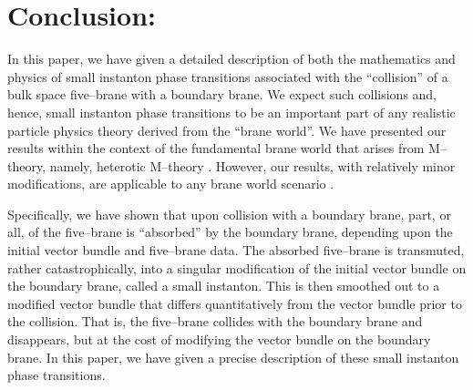 \documentclass[a4paper,12pt]{article}
\numberwithin{equation}{section}
\theoremstyle{plain}
\begin{document}
\section{Conclusion:}


In this paper, we have given a detailed description of both the mathematics
and physics of small instanton phase transitions associated with the
``collision'' of a bulk space five--brane with a boundary brane. We expect
such collisions and, hence, small instanton phase transitions 
to be an important part of any
realistic particle physics theory derived from the ``brane world''. We have
presented our results within the context of the fundamental brane world 
that arises from M--theory, namely, 
heterotic M--theory \cite{losw1, losw2, nse}. 
However, our results, with relatively minor modifications, are applicable to
any brane world scenario \cite{RS,dim, KT}. 

Specifically, we have shown that upon collision with a boundary brane, part,
or all, of the five--brane is ``absorbed'' by the boundary brane, depending
upon the initial vector bundle and five--brane data. 
The absorbed five--brane is transmuted,
rather catastrophically, into a singular modification of the initial 
vector bundle on the boundary brane, called a small instanton. 
This is then smoothed out to a modified vector bundle that differs
quantitatively from the vector bundle prior to the collision. That is, the
five--brane collides with the boundary brane and disappears, but at the cost
of modifying the vector bundle on the boundary brane. In this paper, 
we have given a precise description of these small instanton phase transitions.
\end{document}
